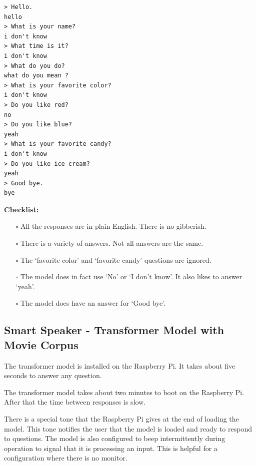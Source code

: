 \begin{verbatim}
> Hello.
hello 
> What is your name?
i don't know 
> What time is it?
i don't know 
> What do you do?
what do you mean ?
> What is your favorite color?
i don't know 
> Do you like red?
no 
> Do you like blue?
yeah 
> What is your favorite candy?
i don't know 
> Do you like ice cream?
yeah 
> Good bye.
bye 
\end{verbatim}

\noindent \textbf{Checklist:} 

\begin{itemize}
	
	\item[\rlap{\raisebox{0.3ex}{\hspace{0.4ex}\scriptsize \ding{52}}}$\square$] All the responses are in plain English. There is no gibberish.
	
	\item[\rlap{\raisebox{0.3ex}{\hspace{0.4ex}\scriptsize \ding{52}}}$\square$] There is a variety of answers. Not all answers are the same.
	
	\item[\rlap{\raisebox{0.3ex}{\hspace{0.4ex}\scriptsize \ding{56}}}$\square$] The `favorite color' and `favorite candy' questions are ignored.
	
	\item[\rlap{\raisebox{0.3ex}{\hspace{0.4ex}\scriptsize \ding{56}}}$\square$] The model does in fact use `No' or `I don't know'. It also likes to answer `yeah'.
	
	\item[\rlap{\raisebox{0.3ex}{\hspace{0.4ex}\scriptsize \ding{52}}}$\square$] The model does have an answer for `Good bye'.
\end{itemize}

\subsection{Smart Speaker - Transformer Model with Movie Corpus}

The transformer model is installed on the Raspberry Pi. It takes about five seconds to answer any question.

The transformer model takes about two minutes to boot on the Raspberry Pi. After that the time between responses is slow. 

There is a special tone that the Raspberry Pi gives at the end of loading the model. This tone notifies the user that the model is loaded and ready to respond to questions. The model is also configured to beep intermittently during operation to signal that it is processing an input. This is helpful for a configuration where there is no monitor.


